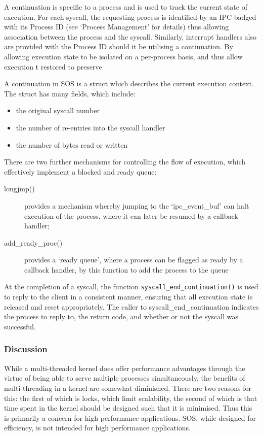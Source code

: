 \documentclass[a4paper,12pt]{article}
\begin{document}
A continuation is specific to a process and is used to track the current state
of execution.  For each syscall, the requesting process is identified by an
IPC badged with its Process ID (see `Process Management' for details) thus
allowing association between the process and the syscall.  Similarly,
interrupt handlers also are provided with the Process ID should it be
utilising a continuation.  By allowing execution state to be isolated on a
per-process basis, and thus allow execution t restored to preserve

A continuation in SOS is a struct which describes the current execution
context.  The struct has many fields, which include:

\begin{itemize}
\item the original syscall number
\item the number of re-entries into the syscall handler
\item the number of bytes read or written
\end{itemize}

There are two further mechanisms for controlling the flow of execution, which
effectively implement a blocked and ready queue:
\begin{description}
\item[longjmp()] provides a mechanism whereby jumping to the `ipc\_event\_buf'
  can halt execution of the process, where it can later be resumed by a
  callback handler;
\item[add\_ready\_proc()] provides a `ready queue', where a process can be
  flagged as ready by a callback handler, by this function to add the process
  to the queue
\end{description}

At the completion of a syscall, the function
\texttt{syscall\_end\_continuation()} is used to reply to the client in a
consistent manner, ensuring that all execution state is released and reset
appropriately.  The caller to syscall\_end\_continuation indicates the process
to reply to, the return code, and whether or not the syscall was successful.

\subsubsection{Discussion}
While a multi-threaded kernel does offer performance advantages through the
virtue of being able to serve multiple processes simultaneously, the benefits
of multi-threading in a kernel are somewhat diminished.  There are two reasons
for this: the first of which is locks, which limit scalability, the second of
which is that time spent in the kernel should be designed such that it is
minimised.  Thus this is primarily a concern for high performance
applications.  SOS, while designed for efficiency, is not intended for high
performance applications.
\end{document}
